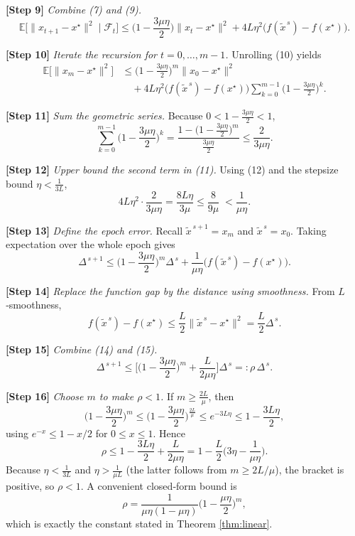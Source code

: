 \documentclass[11pt]{article}
\newcommand{\E}{\mathbb{E}}
\begin{document}
\noindent\textbf{[Step 9]} \emph{Combine (7) and (9).}  
\[
\E\!\big[\|x_{t+1}-x^{\star}\|^{2}\mid\mathcal{F}_t\big]
\le \Big(1-\frac{3\mu\eta}{2}\Big)\|x_t-x^{\star}\|^{2}
      +4L\eta^{2}\big(f(\tilde{x}^{\,s})-f(x^{\star})\big).
\tag{10}
\]

\noindent\textbf{[Step 10]} \emph{Iterate the recursion for $t=0,\dots,m-1$.}  
Unrolling (10) yields
\[
\begin{aligned}
\E\!\big[\|x_{m}-x^{\star}\|^{2}\big]
&\le \Big(1-\frac{3\mu\eta}{2}\Big)^{m}\|x_{0}-x^{\star}\|^{2}\\
&\quad +4L\eta^{2}\big(f(\tilde{x}^{\,s})-f(x^{\star})\big)
   \sum_{k=0}^{m-1}\Big(1-\frac{3\mu\eta}{2}\Big)^{k}.
\end{aligned}
\tag{11}
\]

\noindent\textbf{[Step 11]} \emph{Sum the geometric series.}  
Because $0<1-\frac{3\mu\eta}{2}<1$, 
\[
\sum_{k=0}^{m-1}\Big(1-\frac{3\mu\eta}{2}\Big)^{k}
= \frac{1-\big(1-\frac{3\mu\eta}{2}\big)^{m}}{\frac{3\mu\eta}{2}}
\le \frac{2}{3\mu\eta}.
\tag{12}
\]

\noindent\textbf{[Step 12]} \emph{Upper bound the second term in (11).}  
Using (12) and the stepsize bound $\eta<\frac{1}{3L}$,
\[
4L\eta^{2}\cdot\frac{2}{3\mu\eta}
= \frac{8L\eta}{3\mu}
\le \frac{8}{9\mu}\;<\frac{1}{\mu\eta}.
\tag{13}
\]

\noindent\textbf{[Step 13]} \emph{Define the epoch error.}  
Recall $\tilde{x}^{\,s+1}=x_m$ and $\tilde{x}^{\,s}=x_0$. Taking expectation over the whole epoch gives
\[
\Delta^{\,s+1}
\le \Big(1-\frac{3\mu\eta}{2}\Big)^{m}\Delta^{\,s}
     +\frac{1}{\mu\eta}\big(f(\tilde{x}^{\,s})-f(x^{\star})\big).
\tag{14}
\]

\noindent\textbf{[Step 14]} \emph{Replace the function gap by the distance using smoothness.}  
From $L$‑smoothness,
\[
f(\tilde{x}^{\,s})-f(x^{\star})\le \frac{L}{2}\|\tilde{x}^{\,s}-x^{\star}\|^{2}
= \frac{L}{2}\Delta^{\,s}.
\tag{15}
\]

\noindent\textbf{[Step 15]} \emph{Combine (14) and (15).}  
\[
\Delta^{\,s+1}
\le \Big[\Big(1-\frac{3\mu\eta}{2}\Big)^{m}
      +\frac{L}{2\mu\eta}\Big]\Delta^{\,s}
=: \rho\,\Delta^{\,s}.
\tag{16}
\]

\noindent\textbf{[Step 16]} \emph{Choose $m$ to make $\rho<1$.}  
If $m\ge \frac{2L}{\mu}$, then
\[
\Big(1-\frac{3\mu\eta}{2}\Big)^{m}
\le \Big(1-\frac{3\mu\eta}{2}\Big)^{\frac{2L}{\mu}}
\le e^{-3L\eta}\le 1-\frac{3L\eta}{2},
\]
using $e^{-x}\le 1-x/2$ for $0\le x\le1$. Hence
\[
\rho\le 1-\frac{3L\eta}{2}+\frac{L}{2\mu\eta}
= 1-\frac{L}{2}\Big(3\eta-\frac{1}{\mu\eta}\Big).
\]
Because $\eta<\frac{1}{3L}$ and $\eta>\frac{1}{\mu L}$ (the latter follows from $m\ge 2L/\mu$), the bracket is positive, so $\rho<1$.
A convenient closed‑form bound is
\[
\rho=\frac{1}{\mu\eta(1-\mu\eta)}\Big(1-\frac{\mu\eta}{2}\Big)^{m},
\]
which is exactly the constant stated in Theorem \ref{thm:linear}.  
\end{document}
